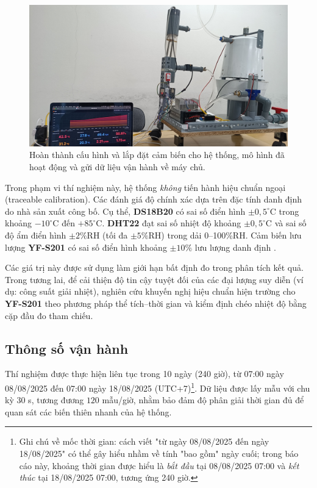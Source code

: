 \documentclass[../main.tex]{subfiles}
\begin{document}
\begin{figure}[H]
    \centering
    \includegraphics[width=1\textwidth]{Hinhve/lap_dat.jpg}
    \caption{Hoàn thành cấu hình và lắp đặt cảm biến cho hệ thống, mô hình đã hoạt động và gửi dữ liệu vận hành về máy chủ.}
    \label{fig:lap_dat}
\end{figure}

Trong phạm vi thí nghiệm này, hệ thống \emph{không} tiến hành hiệu chuẩn ngoại (traceable calibration). Các đánh giá độ chính xác dựa trên đặc tính danh định do nhà sản xuất công bố. Cụ thể, \textbf{DS18B20} có sai số điển hình $\pm 0{,}5^\circ\mathrm{C}$ trong khoảng $-10^\circ\mathrm{C}$ đến $+85^\circ\mathrm{C}$. \textbf{DHT22} đạt sai số nhiệt độ khoảng $\pm 0{,}5^\circ\mathrm{C}$ và sai số độ ẩm điển hình $\pm 2\%$RH (tối đa $\pm 5\%$RH) trong dải 0–100\%RH. Cảm biến lưu lượng \textbf{YF-S201} có sai số điển hình khoảng $\pm 10\%$ lưu lượng danh định \cite{datasheet_DS18B20,datasheet_DHT22,datasheet_YFS201}.

Các giá trị này được sử dụng làm giới hạn bất định đo trong phân tích kết quả. Trong tương lai, để cải thiện độ tin cậy tuyệt đối của các đại lượng suy diễn (ví dụ: công suất giải nhiệt), nghiên cứu khuyến nghị hiệu chuẩn hiện trường cho \textbf{YF-S201} theo phương pháp thể tích–thời gian và kiểm định chéo nhiệt độ bằng cặp đầu đo tham chiếu.

\subsection{Thông số vận hành}
\label{sec:operating_parameters_config}

Thí nghiệm được thực hiện liên tục trong 10 ngày (240 giờ), từ 07{:}00 ngày 08/08/2025 đến 07{:}00 ngày 18/08/2025 (UTC+7)\footnote{Ghi chú về mốc thời gian: cách viết "từ ngày 08/08/2025 đến ngày 18/08/2025" có thể gây hiểu nhầm về tính "bao gồm" ngày cuối; trong báo cáo này, khoảng thời gian được hiểu là \emph{bắt đầu} tại 08/08/2025 07{:}00 và \emph{kết thúc} tại 18/08/2025 07{:}00, tương ứng 240 giờ.}. Dữ liệu được lấy mẫu với chu kỳ $30$ s, tương đương $120$ mẫu/giờ, nhằm bảo đảm độ phân giải thời gian đủ để quan sát các biến thiên nhanh của hệ thống.
\end{document}
